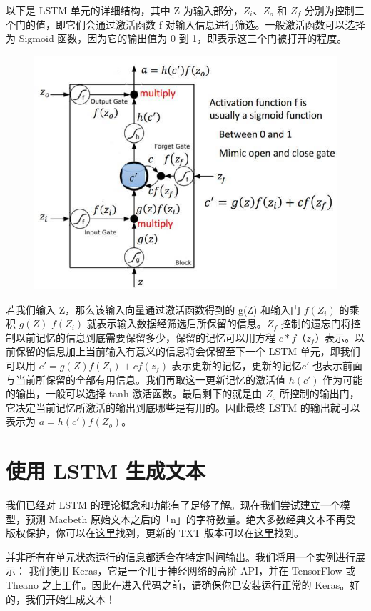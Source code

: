 \documentclass{article}
\begin{document}
以下是 LSTM 单元的详细结构，其中 Z 为输入部分，$Z_i$、$Z_o$ 和 $Z_f$ 分别为控制三个门的值，即它们会通过激活函数 f 对输入信息进行筛选。一般激活函数可以选择为 Sigmoid 函数，因为它的输出值为 0 到 1，即表示这三个门被打开的程度。
\begin{figure}[H]
	\centering
	\includegraphics[scale=0.3]{6.jpg}
\end{figure}
若我们输入 Z，那么该输入向量通过激活函数得到的 g(Z) 和输入门 $f(Z_i)$ 的乘积 $g(Z)$ $f(Z_i )$ 就表示输入数据经筛选后所保留的信息。$Z_f$ 控制的遗忘门将控制以前记忆的信息到底需要保留多少，保留的记忆可以用方程 $c*f（z_f$）表示。以前保留的信息加上当前输入有意义的信息将会保留至下一个 LSTM 单元，即我们可以用 $c' = g(Z)f(Z_i) + cf(z_f)$ 表示更新的记忆，更新的记忆$ c'$ 也表示前面与当前所保留的全部有用信息。我们再取这一更新记忆的激活值 $h(c')$ 作为可能的输出，一般可以选择 tanh 激活函数。最后剩下的就是由 $Z_o$ 所控制的输出门，它决定当前记忆所激活的输出到底哪些是有用的。因此最终 LSTM 的输出就可以表示为 $a = h(c')f(Z_o)$。
\section{ 使用 LSTM 生成文本}

我们已经对 LSTM 的理论概念和功能有了足够了解。现在我们尝试建立一个模型，预测 Macbeth 原始文本之后的「n」的字符数量。绝大多数经典文本不再受版权保护，你可以在\href{https://www.gutenberg.org/}{这里}找到，更新的 TXT 版本可以在\href{https://s3-ap-south-1.amazonaws.com/av-blog-media/wp-content/uploads/2017/12/10165151/macbeth.txt}{这里}找到。

并非所有在单元状态运行的信息都适合在特定时间输出。我们将用一个实例进行展示：
我们使用 Keras，它是一个用于神经网络的高阶 API，并在 TensorFlow 或 Theano 之上工作。因此在进入代码之前，请确保你已安装运行正常的 Keras。好的，我们开始生成文本！
\end{document}
